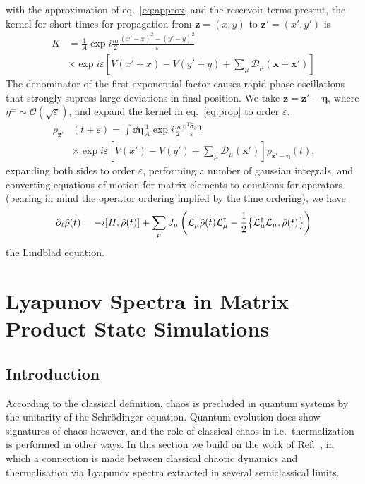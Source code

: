 \documentclass{article}
\let\vec\bm
\begin{document}
with the approximation of eq.~\ref{eq:approx} and the reservoir terms present, the kernel for short times for propagation from $\vec{z} = (x, y)$ to $\vec{z}' = (x', y')$ is
\begin{align}
    K &= \frac{1}{A} \exp{i\frac{m}{2}\frac{\left({x}'-{x}\right)^2-\left({y}'-{y}\right)^2}{\varepsilon}}\\
    &\times \exp{i\varepsilon \left[V\left({x}'+{x}\right)-V\left({y}'+{y}\right) + \sum_\mu \mathcal{D}_\mu(\vec{x}+\vec{x}')\right]}\nonumber
\end{align}
The denominator of the first exponential factor causes rapid phase oscillations that strongly supress large deviations in final position.
We take $\vec{z} = \vec{z}' - \vec{\eta}$, where $\eta^\pm  \sim \mathcal{O}(\sqrt{\varepsilon})$, and expand the kernel in eq.~\ref{eq:prop} to order $\varepsilon$. 
\begin{align}
    \rho_{\vec{z}'}&(t+\varepsilon) = \int \dd{\vec{\eta}}\frac{1}{A} \exp{i\frac{m}{2}\frac{\vec{\eta}^T\hat{\sigma}_3\vec{\eta}}{\varepsilon}}\\
    &\times \exp{i\varepsilon \left[V\left({x'}\right)-V\left({y'}\right) + \sum_\mu \mathcal{D}_\mu(\vec{x'})\right]}\rho_{\vec{z}'-\vec{\eta}}(t).\nonumber
\end{align}
expanding both sides to order $\varepsilon$, performing a number of gaussian integrals, and converting equations of motion for matrix elements to equations for operators (bearing in mind the operator ordering implied by the time ordering), we have
\begin{equation}
    \partial_t \hat{\rho}(t) = -i \comm{H}{\hat{\rho}(t)} + \sum_\mu J_\mu\left( \mathcal{L}_\mu\hat{\rho}(t)\mathcal{L}_\mu^\dagger - \frac{1}{2} \acomm{\mathcal{L}_\mu^\dagger\mathcal{L}_\mu}{\hat{\rho}(t)}\right)\nonumber
\end{equation}
the Lindblad equation.
\section{Lyapunov Spectra in Matrix Product State Simulations}\label{sec:chaos}
%
\subsection{Introduction}
%
According to the classical definition, chaos is precluded in quantum systems by the unitarity of the Schr\"odinger equation.
Quantum evolution does show signatures of chaos however, and the role of classical chaos in i.e.\ thermalization is performed in other ways.
In this section we build on the work of Ref.~\cite{Andrew}, in which a connection is made between classical chaotic dynamics and thermalisation via Lyapunov spectra extracted in several semiclassical limits.
%
\end{document}
